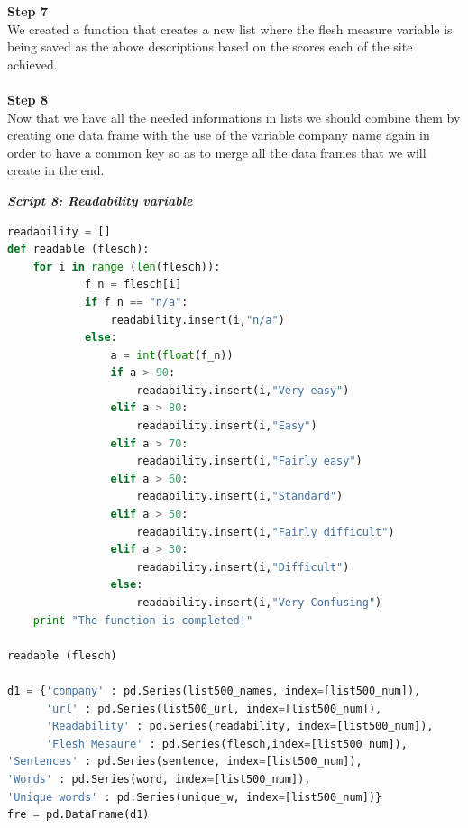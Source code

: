 \documentclass{article}
\begin{document}
\textbf{Step 7} \\
We created a function that creates a new list where the flesh measure variable is being saved as the above descriptions based on the scores each of the site achieved.\\\\
\textbf{Step 8} \\
Now that we have all the needed informations in lists we should combine them by creating one data frame with the use of the variable company name again in order to have a common key so as to merge all the data frames that we will create in the end.
\begin{center}
\textit{\textbf{Script 8: Readability variable}}
\end{center}
\begin{lstlisting}[language=Python]
readability = []
def readable (flesch):
    for i in range (len(flesch)):
            f_n = flesch[i]
            if f_n == "n/a":
                readability.insert(i,"n/a")                
            else:
                a = int(float(f_n))
                if a > 90:    
                    readability.insert(i,"Very easy")                    
                elif a > 80:
                    readability.insert(i,"Easy")
                elif a > 70:
                    readability.insert(i,"Fairly easy")
                elif a > 60:
                    readability.insert(i,"Standard")
                elif a > 50:
                    readability.insert(i,"Fairly difficult")
                elif a > 30:
                    readability.insert(i,"Difficult")
                else:
                    readability.insert(i,"Very Confusing")                    
    print "The function is completed!"

readable (flesch)

d1 = {'company' : pd.Series(list500_names, index=[list500_num]),
      'url' : pd.Series(list500_url, index=[list500_num]),
      'Readability' : pd.Series(readability, index=[list500_num]),
      'Flesh_Mesaure' : pd.Series(flesch,index=[list500_num]),
'Sentences' : pd.Series(sentence, index=[list500_num]),
'Words' : pd.Series(word, index=[list500_num]),
'Unique words' : pd.Series(unique_w, index=[list500_num])}
fre = pd.DataFrame(d1)    
\end{lstlisting}
\end{document}
